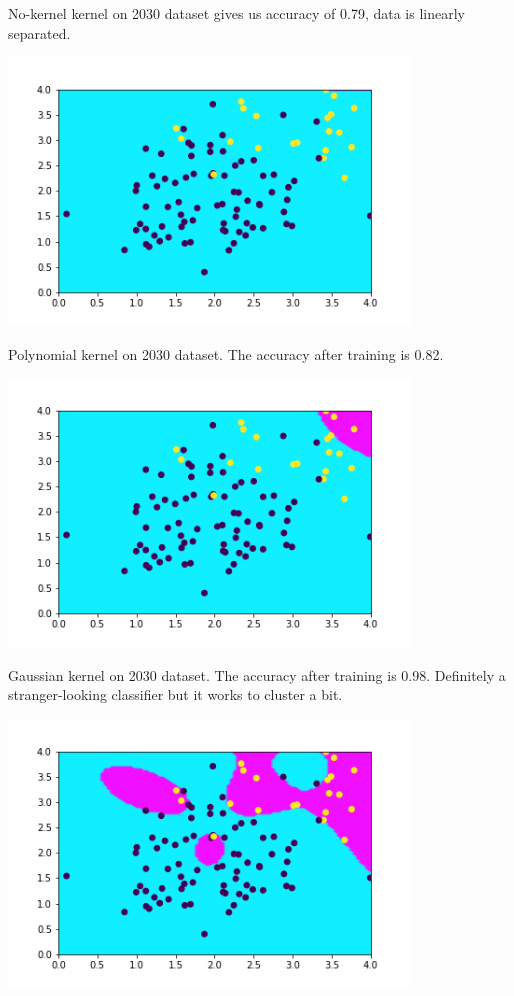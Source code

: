 \documentclass[newpage]{homework}
\begin{document}
No-kernel kernel on 2030 dataset gives us accuracy of 0.79, data is linearly separated.
\begin{center}
    \includegraphics[width=0.8\textwidth]{1di.png}
\end{center}

\newpage Polynomial kernel on 2030 dataset. The accuracy after training is 0.82.
\begin{center}
    \includegraphics[width=0.8\textwidth]{1dii.png}
\end{center}

Gaussian kernel on 2030 dataset. The accuracy after training is 0.98. Definitely a stranger-looking classifier but it works to cluster a bit.
\begin{center}
    \includegraphics[width=0.8\textwidth]{1diii.png}
\end{center}
\end{document}

